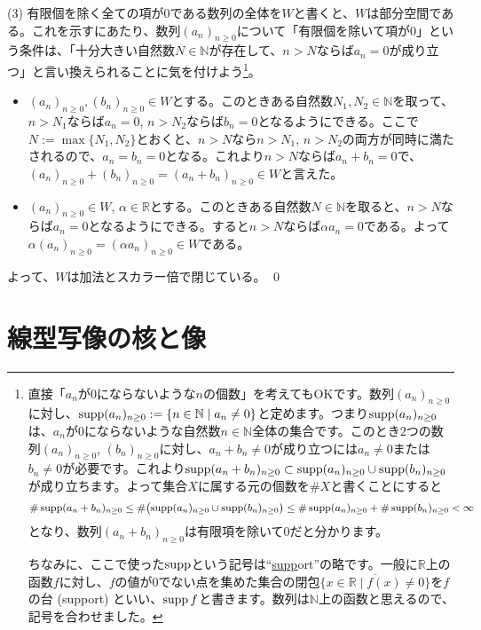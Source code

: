 \noindent (3) 有限個を除く全ての項が$0$である数列の全体を$W$と書くと、$W$は部分空間である。これを示すにあたり、数列$(a_n)_{n\geq 0}$について「有限個を除いて項が$0$」という条件は、「十分大きい自然数$N\in\mathbb{N}$が存在して、$n>N$ならば$a_n = 0$が成り立つ」と言い換えられることに気を付けよう\footnote{直接「$a_n$が$0$にならないような$n$の個数」を考えてもOKです。数列$(a_n)_{n \geq 0}$に対し、$\operatorname{supp} (a_n)_{n\geq 0}:=\{n\in\mathbb{N}\mid a_n \neq 0\}$と定めます。つまり$\operatorname{supp} (a_n)_{n\geq 0}$は、$a_n$が$0$にならないような自然数$n\in\mathbb{N}$全体の集合です。このとき$2$つの数列$(a_n)_{n \geq 0}$, $(b_n)_{n \geq 0}$に対し、$a_n + b_n \neq 0$が成り立つには$a_n \neq 0$または$b_n \neq 0$が必要です。これより$\operatorname{supp} (a_n + b_n)_{n\geq 0} \subset \operatorname{supp} (a_n)_{n\geq 0} \cup \operatorname{supp} (b_n)_{n\geq 0}$が成り立ちます。よって集合$X$に属する元の個数を$\#X$と書くことにすると
\[
\#\operatorname{supp} (a_n + b_n)_{n\geq 0} \leq \#\bigl(\operatorname{supp} (a_n)_{n\geq 0} \cup \operatorname{supp} (b_n)_{n\geq 0}\bigr)
\leq \#\operatorname{supp} (a_n)_{n\geq 0} + \#\operatorname{supp} (b_n)_{n\geq 0} < \infty
\]
となり、数列$(a_n + b_n)_{n \geq 0}$は有限項を除いて$0$だと分かります。

ちなみに、ここで使った$\operatorname{supp}$という記号は``\underline{supp}ort''の略です。一般に$\mathbb{R}$上の函数$f$に対し、$f$の値が$0$でない点を集めた集合の閉包$\overline{\{x\in\mathbb{R}\mid f(x)\neq 0\}}$を$f$の台 (support) といい、$\operatorname{supp} f$と書きます。数列は$\mathbb{N}$上の函数と思えるので、記号を合わせました。
}。
\begin{itemize}
\item $(a_n)_{n \geq 0}, (b_n)_{n \geq 0}\in W$とする。このときある自然数$N_1, N_2\in\mathbb{N}$を取って、$n > N_1$ならば$a_n =0$, $n > N_2$ならば$b_n = 0$となるようにできる。ここで$N := \max\{N_1, N_2\}$とおくと、$n > N$なら$n > N_1$, $n > N_2$の両方が同時に満たされるので、$a_n = b_n = 0$となる。これより$n > N$ならば$a_n + b_n = 0$で、$(a_n)_{n \geq 0} + (b_n)_{n \geq 0} = (a_n + b_n)_{n \geq 0}\in W$と言えた。
\item $(a_n)_{n \geq 0}\in W$, $\alpha \in \mathbb{R}$とする。このときある自然数$N\in\mathbb{N}$を取ると、$n > N$ならば$a_n = 0$となるようにできる。すると$n > N$ならば$\alpha a_n = 0$である。よって$\alpha (a_n)_{n \geq 0} = (\alpha a_n)_{n \geq 0}\in W$である。
\end{itemize}
よって、$W$は加法とスカラー倍で閉じている。 \qed

\section{線型写像の核と像}

